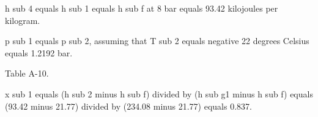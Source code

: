 h sub 4 equals h sub 1 equals h sub f at 8 bar equals 93.42 kilojoules per kilogram.

p sub 1 equals p sub 2, assuming that T sub 2 equals negative 22 degrees Celsius equals 1.2192 bar.

Table A-10.

x sub 1 equals (h sub 2 minus h sub f) divided by (h sub g1 minus h sub f) equals (93.42 minus 21.77) divided by (234.08 minus 21.77) equals 0.837.